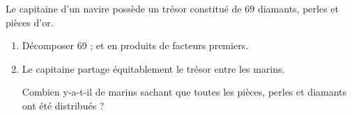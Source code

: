 
\medskip

Le capitaine d'un navire possède un trésor constitué de $69$ diamants,  perles et  pièces d'or.

\medskip

\begin{enumerate}
\item Décomposer 69 ;  et  en produits de facteurs premiers.
\item Le capitaine partage équitablement le trésor entre les marins.

Combien y-a-t-il de marins sachant que toutes les pièces, perles et diamants ont été distribués ?
\end{enumerate}


\bigskip

